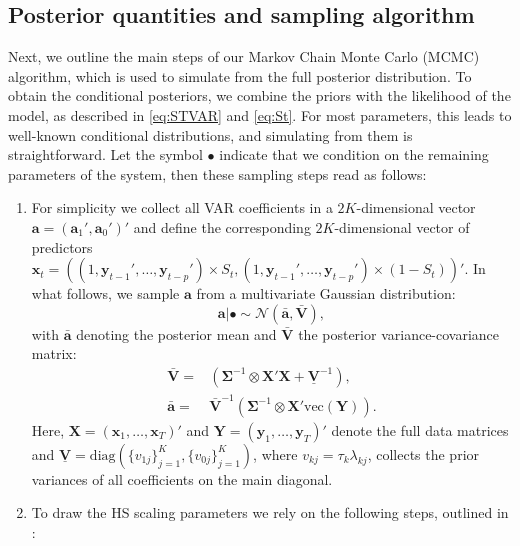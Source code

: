 \subsection{Posterior quantities and sampling algorithm}\label{app:mcmc}
Next, we outline the main steps of our Markov Chain Monte Carlo (MCMC) algorithm, which is used to simulate from the full posterior distribution. To obtain the conditional posteriors, we combine the priors with the likelihood of the model, as described in \autoref{eq:STVAR} and \autoref{eq:St}. For most parameters, this leads to well-known conditional distributions, and simulating from them is straightforward. Let the symbol $\bullet$ indicate that we condition on the remaining parameters of the system, then these sampling steps read as follows: 
\begin{enumerate}
    \item For simplicity we collect all VAR coefficients in a $2K$-dimensional vector $\bm a = (\bm a_1', \bm a_0')'$ and define the corresponding $2K$-dimensional vector of predictors $\bm x_t = \left((1, \bm y_{t-1}', \dots, \bm y_{t-p}')\times S_t,  (1, \bm y_{t-1}', \dots, \bm y_{t-p}') \times (1-S_t)\right)'$. 
    In what follows, we sample $\bm a$ from a multivariate Gaussian distribution: 
    \begin{equation*}
        \bm a|\bullet \sim \mathcal{N}\left(\bar{\bm a}, \bar{\bm V} \right),
    \end{equation*}
    with $\bar{\bm a}$ denoting the posterior mean and $\bar{\bm V}$ the posterior variance-covariance matrix: 
    \begin{equation*}
    \begin{aligned}
       \bar{\bm V} =& \left(\bm \Sigma^{-1} \otimes \bm X'\bm X + \underline{\bm V}^{-1} \right), \\
       \bar{\bm a} =&  \bar{\bm V}^{-1}  \left(\bm \Sigma^{-1} \otimes \bm X'\text{vec}(\bm Y) \right). \end{aligned}
    \end{equation*}
    Here, $\bm X = (\bm x_1, \dots, \bm x_T)'$ and $\bm Y = (\bm y_1, \dots, \bm y_T)'$ denote the full data matrices and $\underline{\bm V} = \text{diag}\left(\{v_{1j}\}_{j=1}^{K}, \{v_{0j}\}_{j=1}^{K}\right)$, where $v_{kj} = \tau_k \lambda_{kj}$, collects the prior variances of all coefficients on the main diagonal. 
    \item To draw the HS scaling parameters we rely on the following steps, outlined in \cite{makalic2015simple}: 
    \begin{equation*}

\end{equation*}
\end{enumerate}
